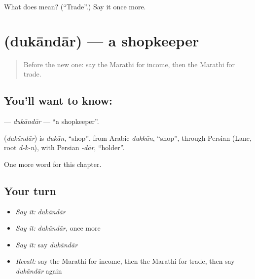 \begin{tcolorbox}[breakable,colback=teal!4,colframe=teal!35!black,title={Before you move on}]
What does  mean? (\textquotedblleft{}Trade\textquotedblright{}.) Say it once more.
\end{tcolorbox}
\section[\texorpdfstring{\mr{दुकानदार} (dukāndār)}{दुकानदार (dukāndār)}]{ (dukāndār) — a shopkeeper}

\label{lesson:MR-C219-dukandar}



\begin{quote}
Before the new one: say the Marathi for income, then the Marathi for trade.
\end{quote}

\subsection*{You'll want to know: }
\textbf{} — \emph{dukāndār} — \textquotedblleft{}a shopkeeper\textquotedblright{}.

\begin{cousinweb}
\textbf{} (\emph{dukāndār}) is \emph{dukān}, \textquotedblleft{}shop\textquotedblright{}, from Arabic \emph{dukkān}, \textquotedblleft{}shop\textquotedblright{}, through Persian (Lane, root \emph{d-k-n}), with Persian \emph{-dār}, \textquotedblleft{}holder\textquotedblright{}.
\end{cousinweb}

\begin{grammarlens}[title={What you've built}]
One more word for this chapter.
\end{grammarlens}

\subsection*{Your turn}
\begin{itemize}
\raggedright
  \item \emph{Say it:} \emph{dukāndār}
  \item \emph{Say it:} \emph{dukāndār}, once more
  \item \emph{Say it:} say \emph{dukāndār}
  \item \emph{Recall:} say the Marathi for income, then the Marathi for trade, then say \emph{dukāndār} again
\end{itemize}

